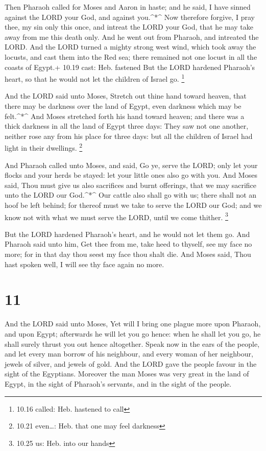  Then Pharaoh called for Moses and Aaron in haste; and he
said, I have sinned against the LORD your God, and against you.\^{}*\^{}
 Now therefore forgive, I pray thee, my sin only this once,
and intreat the LORD your God, that he may take away from me this death
only.  And he went out from Pharaoh, and intreated the
LORD.  And the LORD turned a mighty strong west wind, which
took away the locusts, and cast them into the Red sea; there remained
not one locust in all the coasts of Egypt.+ 10.19 cast: Heb. fastened
 But the LORD hardened Pharaoh's heart, so that he would
not let the children of Israel go. \footnote{10.16 called: Heb. hastened
  to call}

 And the LORD said unto Moses, Stretch out thine hand
toward heaven, that there may be darkness over the land of Egypt, even
darkness which may be felt.\^{}*\^{}  And Moses stretched
forth his hand toward heaven; and there was a thick darkness in all the
land of Egypt three days:  They saw not one another,
neither rose any from his place for three days: but all the children of
Israel had light in their dwellings. \footnote{10.21 even\ldots: Heb.
  that one may feel darkness}

 And Pharaoh called unto Moses, and said, Go ye, serve the
LORD; only let your flocks and your herds be stayed: let your little
ones also go with you.  And Moses said, Thou must give us
also sacrifices and burnt offerings, that we may sacrifice unto the LORD
our God.\^{}*\^{}  Our cattle also shall go with us; there
shall not an hoof be left behind; for thereof must we take to serve the
LORD our God; and we know not with what we must serve the LORD, until we
come thither. \footnote{10.25 us: Heb. into our hands}

 But the LORD hardened Pharaoh's heart, and he would not
let them go.  And Pharaoh said unto him, Get thee from me,
take heed to thyself, see my face no more; for in that day thou seest my
face thou shalt die.  And Moses said, Thou hast spoken
well, I will see thy face again no more.

\hypertarget{section-10}{%
\section{11}\label{section-10}}

 And the LORD said unto Moses, Yet will I bring one plague
more upon Pharaoh, and upon Egypt; afterwards he will let you go hence:
when he shall let you go, he shall surely thrust you out hence
altogether.  Speak now in the ears of the people, and let
every man borrow of his neighbour, and every woman of her neighbour,
jewels of silver, and jewels of gold.  And the LORD gave the
people favour in the sight of the Egyptians. Moreover the man Moses was
very great in the land of Egypt, in the sight of Pharaoh's servants, and
in the sight of the people.

